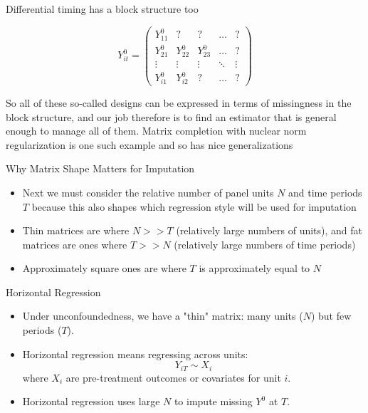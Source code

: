 \documentclass{beamer}
\begin{document}
\begin{frame}{Differential timing has a block structure too}

\begin{center}
\[ Y^0_{it}  =\begin{pmatrix}
    Y^0_{11} & ? & ? & \dots  & ? \\
    Y^0_{21} & Y^0_{22} & Y^0_{23} & \dots  & ? \\
    \vdots & \vdots & \vdots & \ddots & \vdots \\
    Y^0_{i1} & Y^0_{i2} & ? & \dots  & ?
\end{pmatrix}\]
\end{center}

So all of these so-called designs can be expressed in terms of missingness in the block structure, and our job therefore is to find an estimator that is general enough to manage all of them.  Matrix completion with nuclear norm regularization is one such example and so has nice generalizations

\end{frame}


\begin{frame}{Why Matrix Shape Matters for Imputation}

\begin{itemize}
\item Next we must consider the relative number of panel units $N$ and time periods $T$ because this also shapes which regression style will be used for imputation
\item Thin matrices are where $N>>T$ (relatively large numbers of units), and fat matrices are ones where $T>>N$ (relatively large numbers of time periods)
\item Approximately square ones are where $T$ is approximately equal to $N$
\end{itemize}

\end{frame}


\begin{frame}{Horizontal Regression}
\small
\begin{itemize}
  \item Under unconfoundedness, we have a "thin" matrix: many units ($N$) but few periods ($T$).
  \item Horizontal regression means regressing across units:
  \[
  Y_{iT} \sim X_i
  \]
  where $X_i$ are pre-treatment outcomes or covariates for unit $i$.
  \item Horizontal regression uses large $N$ to impute missing $Y^0$ at $T$.
\end{itemize}
\end{frame}
\end{document}
